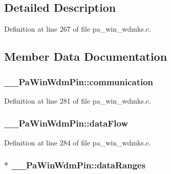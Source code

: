 \subsection{Detailed Description}


Definition at line 267 of file pa\+\_\+win\+\_\+wdmks.\+c.



\subsection{Member Data Documentation}
\subsubsection[{\texorpdfstring{communication}{communication}}]{ \+\_\+\+\_\+\+Pa\+Win\+Wdm\+Pin\+::communication}\hypertarget{struct_____pa_win_wdm_pin_a3d1ada1784d7cecbf90b73b27b31d0a7}{}\label{struct_____pa_win_wdm_pin_a3d1ada1784d7cecbf90b73b27b31d0a7}


Definition at line 281 of file pa\+\_\+win\+\_\+wdmks.\+c.

\subsubsection[{\texorpdfstring{data\+Flow}{dataFlow}}]{ \+\_\+\+\_\+\+Pa\+Win\+Wdm\+Pin\+::data\+Flow}\hypertarget{struct_____pa_win_wdm_pin_a8d798c1a1b09965996a5c29f3797dbff}{}\label{struct_____pa_win_wdm_pin_a8d798c1a1b09965996a5c29f3797dbff}


Definition at line 284 of file pa\+\_\+win\+\_\+wdmks.\+c.

\subsubsection[{\texorpdfstring{data\+Ranges}{dataRanges}}]{$\ast$ \+\_\+\+\_\+\+Pa\+Win\+Wdm\+Pin\+::data\+Ranges}\hypertarget{struct_____pa_win_wdm_pin_a70e5b9749552a4f4bbf76233c984d4e0}{}\label{struct_____pa_win_wdm_pin_a70e5b9749552a4f4bbf76233c984d4e0}


